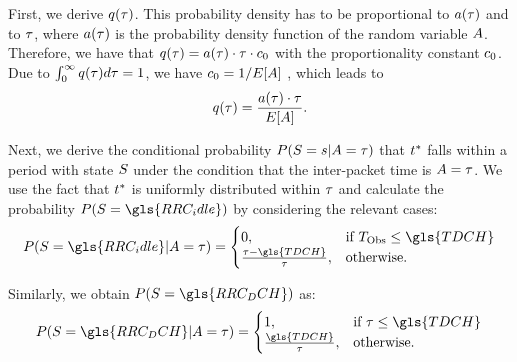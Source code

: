 First, we derive \(q(\tau)\). 
This probability density has to be proportional to \(a(\tau)\) and to \(\tau\), where \(a(\tau)\) is the probability density function of the random variable \(A\). 
Therefore, we have that 
\(q(\tau)=a(\tau)\cdot\tau\cdot c_0\)
with the proportionality constant \(c_0\).
Due to 
\(\int_0^\infty q(\tau)d\tau=1\),
we have 
\(c_0=1/E[A]\)
, which leads to
\begin{equation*}
q(\tau)=\frac{a(\tau) \cdot \tau}{E[A]}.
\label{eq:network:performance_model:system_description:state_distribution:observation_density}
\end{equation*}

Next, we derive the conditional probability
\(P(S=s \vert A = \tau)\)
that \(t^*\) falls within a period with state \(S\) under the condition that the inter-packet time is
\(A = \tau\). 
We use the fact that \(t^*\) is uniformly distributed within \(\tau\) and calculate the probability 
\(P(\RRCState = \gls{RRC_idle})\)
by considering the relevant cases:
\begin{equation}
P(\RRCState=\gls{RRC_idle}\vert \PacketIAT = \ObservationIntervalLength)=
\begin{cases} 
	0,  & \mbox{if } \ObservationInterval \leq \gls{TDCH} \\ 
    \frac{\ObservationIntervalLength - \gls{TDCH}}{\ObservationIntervalLength}, & \mbox{otherwise.}	 
\end{cases}
\end{equation}

Similarly, we obtain \(P(\RRCState = \gls{RRC_DCH})\) as:
\begin{equation}
P(\RRCState=\gls{RRC_DCH} \vert \PacketIAT = \ObservationIntervalLength)=
\begin{cases} 
	1,  & \mbox{if } \ObservationIntervalLength \leq \gls{TDCH} \\ 
    \frac{\gls{TDCH}}{\ObservationIntervalLength}, & \mbox{otherwise.}	 
\end{cases}
\label{eq:network:performance_model:system_description:state_distribution:conditional_probability_dch}
\end{equation} 

